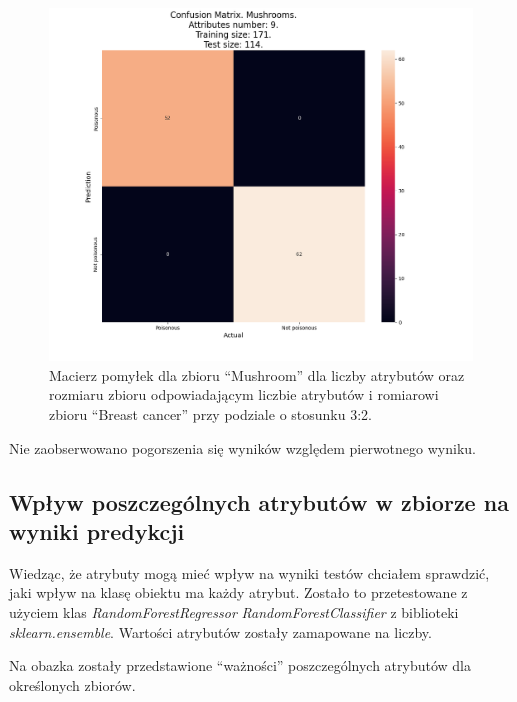 \clearpage
\begin{figure}[h!]
	\centering
		\includegraphics[width=0.7\linewidth]{photos/mush_n_attr_train_size_test_size.png}
        \caption{Macierz pomyłek dla zbioru ``Mushroom'' dla liczby atrybutów oraz rozmiaru zbioru odpowiadającym liczbie atrybutów i romiarowi zbioru ``Breast cancer'' przy podziale o stosunku 3:2.}
\end{figure}

Nie zaobserwowano pogorszenia się wyników względem pierwotnego wyniku.

\subsection{Wpływ poszczególnych atrybutów w zbiorze na wyniki predykcji}
Wiedząc, że atrybuty mogą mieć wpływ na wyniki testów chciałem sprawdzić, jaki
wpływ na klasę obiektu ma każdy atrybut. Zostało to przetestowane z użyciem
klas \textit{RandomForestRegressor} \textit{RandomForestClassifier} z biblioteki
\textit{sklearn.ensemble}. Wartości atrybutów zostały zamapowane na liczby.

Na obazka zostały przedstawione ``ważności'' poszczególnych atrybutów dla
określonych zbiorów.

